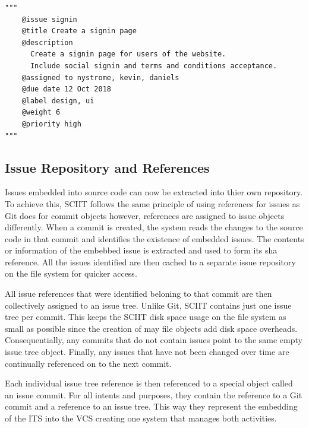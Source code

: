 \documentclass{mproj}
\newenvironment{code}{\captionsetup{type=listing}}{}
\begin{document}
\begin{code}
\label{snip:embedded-issue}
\begin{verbatim}
"""
    @issue signin
    @title Create a signin page
    @description
      Create a signin page for users of the website. 
      Include social signin and terms and conditions acceptance.
    @assigned to nystrome, kevin, daniels
    @due date 12 Oct 2018
    @label design, ui
    @weight 6
    @priority high    
"""
\end{verbatim}
\end{code}




\subsection{Issue Repository and References}

Issues embedded into source code can now be extracted into thier own repository. To achieve this, SCIIT follows the same principle of using references for issues as Git does for commit objects however, references are assigned to issue objects differently. When a commit is created, the system reads the changes to the source code in that commit and identifies the existence of embedded issues. The contents or information of the embebbed issue is extracted and used to form its sha reference. All the issues identified are then cached to a separate issue repository on the file system for quicker access. 

All issue references that were identified beloning to that commit are then collectively assigned to an issue tree. Unlike Git, SCIIT contains just one issue tree per commit. This keeps the SCIIT disk space usage on the file system as small as possible since the creation of may file objects add disk space overheads. Consequentially, any commits that do not contain issues point to the same empty issue tree object. Finally, any issues that have not been changed over time are continually referenced on to the next commit.

Each individual issue tree reference is then referenced to a special object called an issue commit. For all intents and purposes, they contain the reference to a Git commit and a reference to an issue tree. This way they represent the embedding of the ITS into the VCS creating one system that manages both activities. 
\end{document}
